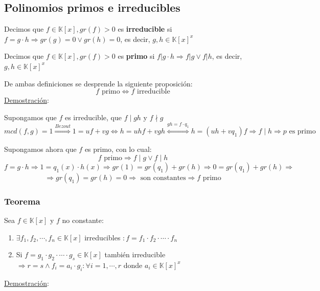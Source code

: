 \documentclass[10pt,a4paper,openright]{book}
\theoremstyle{break}
\begin{document}
\subsection{Polinomios primos e irreducibles}
Decimos que $f\in \mathbb K[x], gr(f)>0$ es \textbf{irreducible} si $f=g\cdot h \Rightarrow gr(g)=0 \vee gr(h)=0$, es decir, $g,h\in \mathbb K[x]^x$\par
Decimos que $f\in \mathbb K[x], gr(f)>0$ es \textbf{primo} si $f|g\cdot h \Rightarrow f|g \vee f|h$, es decir, $g,h\in \mathbb K[x]^x$\par
De ambas definiciones se desprende la siguiente proposición:
$$f\mbox{ primo}\Leftrightarrow f \mbox{ irreducible}$$
\underline{Demostración}:\par
Supongamos que $f$ es irreducible, que $f\mid gh$ y $f\nmid g$
$$mcd(f,g)=1\stackrel{Bezout}{\Rightarrow} 1=uf+vg\Leftrightarrow h=uhf+vgh \stackrel{gh=f\cdot q_1}\Leftrightarrow h=(uh+vq_1)f\Rightarrow f\mid h \Rightarrow p \mbox{ es primo}$$

Supongamos ahora que $f$ es primo, con lo cual:
$$f\mbox{ primo} \Rightarrow f\mid g \vee f\mid h$$
$$f=g\cdot h \Rightarrow 1=q_1(x)\cdot h(x) \Rightarrow gr(1)=gr(q_1)+gr(h)\Rightarrow 0=gr(q_1)+gr(h)\Rightarrow $$
$$\Rightarrow gr(q_1)=gr(h)=0 \Rightarrow \mbox{ son constantes} \Rightarrow f \mbox{ primo}$$

\subsubsection*{Teorema}
Sea $f\in \mathbb K[x]$ y $f$ no constante:
\begin{enumerate}
\item $\exists f_1,f_2, \cdots, f_n\in \mathbb K[x]$ irreducibles $: f=f_1\cdot f_2 \cdot \cdots \cdot f_n$

\item Si $f=g_1\cdot g_2 \cdot \cdots \cdot g_s \in \mathbb K[x]$ también irreducible $\Rightarrow r=s \wedge f_i=a_i\cdot g_i : \forall i=1,\cdots,r$ donde $a_i\in \mathbb K[x]^x$
\end{enumerate}

\underline{Demostración}:
\end{document}

